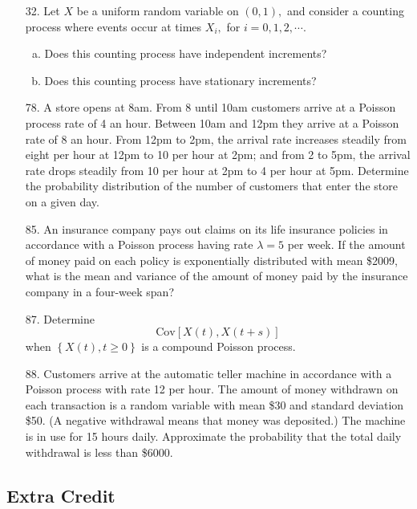 \documentclass{article}
\newcommand{\cov}{\mathrm{Cov}}
\begin{document}
\begin{itemize}
	\item[32.] Let $X$ be a uniform random variable on $(0, 1),$ and consider a counting process where events occur at times $X_i,$ for $i=0, 1, 2, \cdots.$ 
		\begin{enumerate}[(a)]
			\item Does this counting process have independent increments?

			\item Does this counting process have stationary increments?
				
		\end{enumerate}

	\item[78.] A store opens at 8am. From 8 until 10am customers arrive at a Poisson process rate of 4 an hour. Between 10am and 12pm they arrive at a Poisson rate of 8 an hour. From 12pm to 2pm, the arrival rate increases steadily from eight per hour at 12pm to 10 per hour at 2pm; and from 2 to 5pm, the arrival rate drops steadily from 10 per hour at 2pm to 4 per hour at 5pm. Determine the probability distribution of the number of customers that enter the store on a given day.

	\item[85.] An insurance company pays out claims on its life insurance policies in accordance with a Poisson process having rate $\lambda=5$ per week. If the amount of money paid on each policy is exponentially distributed with mean \$2009, what is the mean and variance of the amount of money paid by the insurance company in a four-week span?

	\item[87.] Determine
		\[\cov\left[ X(t), X(t+s) \right]\]
		when $\left\{ X(t), t\ge0 \right\}$ is a compound Poisson process.

	\item[88.] Customers arrive at the automatic teller machine in accordance with a Poisson process with rate 12 per hour. The amount of money withdrawn on each transaction is a random variable with mean \$30 and standard deviation \$50. (A negative withdrawal means that money was deposited.) The machine is in use for 15 hours daily. Approximate the probability that the total daily withdrawal is less than \$6000.
		
\end{itemize}

\subsection*{Extra Credit}
\end{document}
